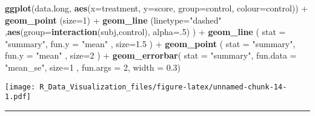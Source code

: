 \documentclass[]{article}
\newenvironment{Shaded}{\begin{snugshade}}{\end{snugshade}}
\newcommand{\KeywordTok}[1]{\textcolor[rgb]{0.13,0.29,0.53}{\textbf{{#1}}}}
\newcommand{\DataTypeTok}[1]{\textcolor[rgb]{0.13,0.29,0.53}{{#1}}}
\newcommand{\DecValTok}[1]{\textcolor[rgb]{0.00,0.00,0.81}{{#1}}}
\newcommand{\FloatTok}[1]{\textcolor[rgb]{0.00,0.00,0.81}{{#1}}}
\newcommand{\StringTok}[1]{\textcolor[rgb]{0.31,0.60,0.02}{{#1}}}
\newcommand{\NormalTok}[1]{{#1}}
\begin{document}
\begin{Shaded}
\begin{Highlighting}[]
\KeywordTok{ggplot}\NormalTok{(data.long, }\KeywordTok{aes}\NormalTok{(}\DataTypeTok{x=}\NormalTok{treatment, }\DataTypeTok{y=}\NormalTok{score, }\DataTypeTok{group=}\NormalTok{control, }\DataTypeTok{colour=}\NormalTok{control)) +}\StringTok{ }
\StringTok{  }\KeywordTok{geom_point}   \NormalTok{(}\DataTypeTok{size=}\DecValTok{1}\NormalTok{)  +}
\StringTok{  }\KeywordTok{geom_line}    \NormalTok{(}\DataTypeTok{linetype=}\StringTok{"dashed"} \NormalTok{,}\KeywordTok{aes}\NormalTok{(}\DataTypeTok{group=}\KeywordTok{interaction}\NormalTok{(subj,control), }\DataTypeTok{alpha=}\NormalTok{.}\DecValTok{5}\NormalTok{) ) +}
\StringTok{  }\KeywordTok{geom_line}    \NormalTok{( }\DataTypeTok{stat =} \StringTok{"summary"}\NormalTok{, }\DataTypeTok{fun.y    =} \StringTok{"mean"}   \NormalTok{, }\DataTypeTok{size=}\FloatTok{1.5} \NormalTok{)  +}
\StringTok{  }\KeywordTok{geom_point}   \NormalTok{( }\DataTypeTok{stat =} \StringTok{"summary"}\NormalTok{, }\DataTypeTok{fun.y    =} \StringTok{"mean"}   \NormalTok{, }\DataTypeTok{size=}\DecValTok{2}   \NormalTok{) +}
\StringTok{  }\KeywordTok{geom_errorbar}\NormalTok{( }\DataTypeTok{stat =} \StringTok{"summary"}\NormalTok{, }\DataTypeTok{fun.data =} \StringTok{"mean_se"}\NormalTok{, }\DataTypeTok{size=}\DecValTok{1} \NormalTok{, }\DataTypeTok{fun.args =} \DecValTok{2}\NormalTok{, }\DataTypeTok{width =} \FloatTok{0.3}\NormalTok{)}
\end{Highlighting}
\end{Shaded}

\texttt{[image: R\_Data\_Visualization\_files/figure-latex/unnamed-chunk-14-1.pdf]}

\begin{center}\rule{0.5\linewidth}{\linethickness}\end{center}
\end{document}
